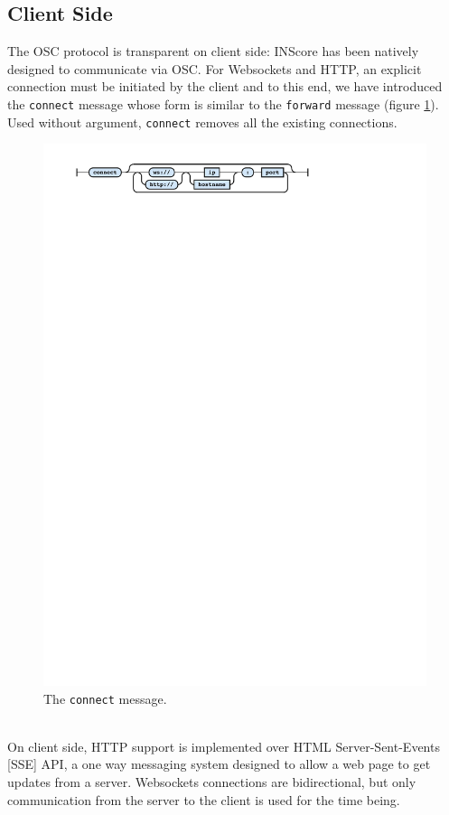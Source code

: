 \documentclass{article}
\newcommand{\icode}[1]	{{\small \texttt{#1}}}
\begin{document}
\subsection{Client Side}\label{sec:client}
The OSC protocol is transparent on client side: INScore has been natively designed to communicate via OSC.
For Websockets and HTTP, an explicit connection must be initiated by the client and to this end, we have introduced the \icode{connect} message whose form is similar to the \icode{forward} message (figure \ref{fig:connect}). Used without argument, \icode{connect} removes all the existing connections.
\begin{figure}[h]
\centering
\includegraphics[width=0.98\columnwidth]{rsrc/faust5.pdf}
\caption{The \icode{connect} message.}
\label{fig:connect}
\end{figure}\\

On client side, HTTP support is implemented over HTML Server-Sent-Events [SSE] API, a one way messaging system designed to allow a web page to get updates from a server. Websockets connections are bidirectional, but only communication from the server to the client is used for the time being.
\end{document}
